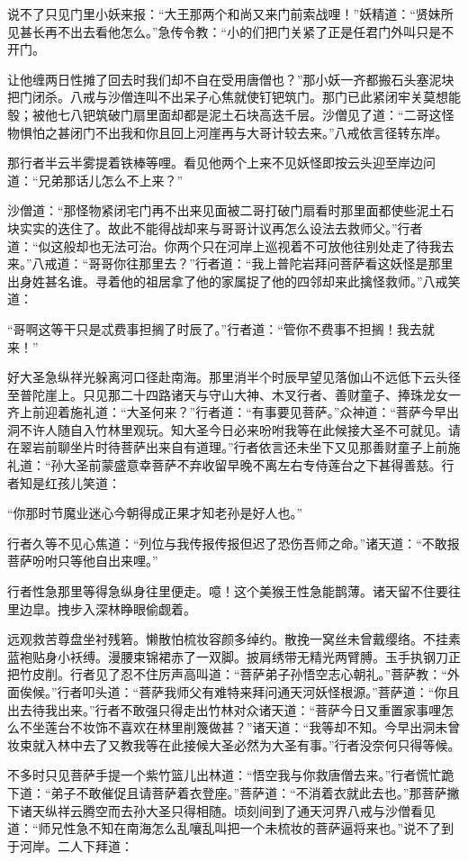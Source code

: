 \documentclass[12pt,UTF8]{ctexbook}
\begin{document}
说不了只见门里小妖来报：“大王那两个和尚又来门前索战哩！”妖精道：“贤妹所见甚长再不出去看他怎么。”急传令教：“小的们把门关紧了正是任君门外叫只是不开门。

让他缠两日性摊了回去时我们却不自在受用唐僧也？”那小妖一齐都搬石头塞泥块把门闭杀。八戒与沙僧连叫不出呆子心焦就使钉钯筑门。那门已此紧闭牢关莫想能彀；被他七八钯筑破门扇里面却都是泥土石块高迭千层。沙僧见了道：“二哥这怪物惧怕之甚闭门不出我和你且回上河崖再与大哥计较去来。”八戒依言径转东岸。

那行者半云半雾提着铁棒等哩。看见他两个上来不见妖怪即按云头迎至岸边问道：“兄弟那话儿怎么不上来？”

沙僧道：“那怪物紧闭宅门再不出来见面被二哥打破门扇看时那里面都使些泥土石块实实的迭住了。故此不能得战却来与哥哥计议再怎么设法去救师父。”行者道：“似这般却也无法可治。你两个只在河岸上巡视着不可放他往别处走了待我去来。”八戒道：“哥哥你往那里去？”行者道：“我上普陀岩拜问菩萨看这妖怪是那里出身姓甚名谁。寻着他的祖居拿了他的家属捉了他的四邻却来此擒怪救师。”八戒笑道：

“哥啊这等干只是忒费事担搁了时辰了。”行者道：“管你不费事不担搁！我去就来！”

好大圣急纵祥光躲离河口径赴南海。那里消半个时辰早望见落伽山不远低下云头径至普陀崖上。只见那二十四路诸天与守山大神、木叉行者、善财童子、捧珠龙女一齐上前迎着施礼道：“大圣何来？”行者道：“有事要见菩萨。”众神道：“菩萨今早出洞不许人随自入竹林里观玩。知大圣今日必来吩咐我等在此候接大圣不可就见。请在翠岩前聊坐片时待菩萨出来自有道理。”行者依言还未坐下又见那善财童子上前施礼道：“孙大圣前蒙盛意幸菩萨不弃收留早晚不离左右专侍莲台之下甚得善慈。行者知是红孩儿笑道：

“你那时节魔业迷心今朝得成正果才知老孙是好人也。”

行者久等不见心焦道：“列位与我传报传报但迟了恐伤吾师之命。”诸天道：“不敢报菩萨吩咐只等他自出来哩。”

行者性急那里等得急纵身往里便走。噫！这个美猴王性急能鹊薄。诸天留不住要往里边皐。拽步入深林睁眼偷觑着。

远观救苦尊盘坐衬残箬。懒散怕梳妆容颜多绰约。散挽一窝丝未曾戴缨络。不挂素蓝袍贴身小袄缚。漫腰束锦裙赤了一双脚。披肩绣带无精光两臂膊。玉手执钢刀正把竹皮削。行者见了忍不住厉声高叫道：“菩萨弟子孙悟空志心朝礼。”菩萨教：“外面俟候。”行者叩头道：“菩萨我师父有难特来拜问通天河妖怪根源。”菩萨道：“你且出去待我出来。”行者不敢强只得走出竹林对众诸天道：“菩萨今日又重置家事哩怎么不坐莲台不妆饰不喜欢在林里削篾做甚？”诸天道：“我等却不知。今早出洞未曾妆束就入林中去了又教我等在此接候大圣必然为大圣有事。”行者没奈何只得等候。

不多时只见菩萨手提一个紫竹篮儿出林道：“悟空我与你救唐僧去来。”行者慌忙跪下道：“弟子不敢催促且请菩萨着衣登座。”菩萨道：“不消着衣就此去也。”那菩萨撇下诸天纵祥云腾空而去孙大圣只得相随。顷刻间到了通天河界八戒与沙僧看见道：“师兄性急不知在南海怎么乱嚷乱叫把一个未梳妆的菩萨逼将来也。”说不了到于河岸。二人下拜道：
\end{document}
